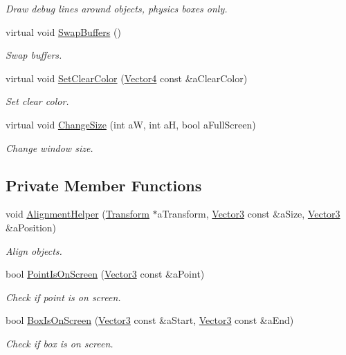 \begin{DoxyCompactItemize}
\begin{DoxyCompactList}\small\item\em Draw debug lines around objects, physics boxes only. \end{DoxyCompactList}\item 
virtual void \hyperlink{classPCScreen_a982ec5cebedc26b5c66130ffb54512a4}{Swap\+Buffers} ()
\begin{DoxyCompactList}\small\item\em Swap buffers. \end{DoxyCompactList}\item 
virtual void \hyperlink{classPCScreen_af9866ba56f6c7dabe28daf1eceed4f8b}{Set\+Clear\+Color} (\hyperlink{structVector4}{Vector4} const \&a\+Clear\+Color)
\begin{DoxyCompactList}\small\item\em Set clear color. \end{DoxyCompactList}\item 
virtual void \hyperlink{classPCScreen_ad70639e4f6e01e14274733a9172bba9e}{Change\+Size} (int aW, int aH, bool a\+Full\+Screen)
\begin{DoxyCompactList}\small\item\em Change window size. \end{DoxyCompactList}\end{DoxyCompactItemize}
\subsection*{Private Member Functions}
\begin{DoxyCompactItemize}
\item 
void \hyperlink{classPCScreen_a2ae7c603a2a8fc192e9732784ba1e4e4}{Alignment\+Helper} (\hyperlink{classTransform}{Transform} $\ast$a\+Transform, \hyperlink{structVector3}{Vector3} const \&a\+Size, \hyperlink{structVector3}{Vector3} \&a\+Position)
\begin{DoxyCompactList}\small\item\em Align objects. \end{DoxyCompactList}\item 
bool \hyperlink{classPCScreen_abb48bf1455e208e1ce7e4ca2fc20cc69}{Point\+Is\+On\+Screen} (\hyperlink{structVector3}{Vector3} const \&a\+Point)
\begin{DoxyCompactList}\small\item\em Check if point is on screen. \end{DoxyCompactList}\item 
bool \hyperlink{classPCScreen_a93578d7ac6f17668c071bea21d3ed8d5}{Box\+Is\+On\+Screen} (\hyperlink{structVector3}{Vector3} const \&a\+Start, \hyperlink{structVector3}{Vector3} const \&a\+End)
\begin{DoxyCompactList}\small\item\em Check if box is on screen. \end{DoxyCompactList}\end{DoxyCompactItemize}
